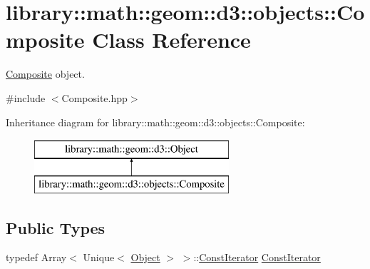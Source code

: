 \hypertarget{classlibrary_1_1math_1_1geom_1_1d3_1_1objects_1_1_composite}{}\section{library\+:\+:math\+:\+:geom\+:\+:d3\+:\+:objects\+:\+:Composite Class Reference}
\label{classlibrary_1_1math_1_1geom_1_1d3_1_1objects_1_1_composite}


\hyperlink{classlibrary_1_1math_1_1geom_1_1d3_1_1objects_1_1_composite}{Composite} object.  




{\ttfamily \#include $<$Composite.\+hpp$>$}

Inheritance diagram for library\+:\+:math\+:\+:geom\+:\+:d3\+:\+:objects\+:\+:Composite\+:\begin{figure}[H]
\begin{center}
\leavevmode
\includegraphics[height=2.000000cm]{classlibrary_1_1math_1_1geom_1_1d3_1_1objects_1_1_composite}
\end{center}
\end{figure}
\subsection*{Public Types}
\begin{DoxyCompactItemize}
\item 
typedef Array$<$ Unique$<$ \hyperlink{classlibrary_1_1math_1_1geom_1_1d3_1_1_object}{Object} $>$ $>$\+::\hyperlink{classlibrary_1_1math_1_1geom_1_1d3_1_1objects_1_1_composite_a52745f3c676ff98e099683b978253fc5}{Const\+Iterator} \hyperlink{classlibrary_1_1math_1_1geom_1_1d3_1_1objects_1_1_composite_a52745f3c676ff98e099683b978253fc5}{Const\+Iterator}
\end{DoxyCompactItemize}
